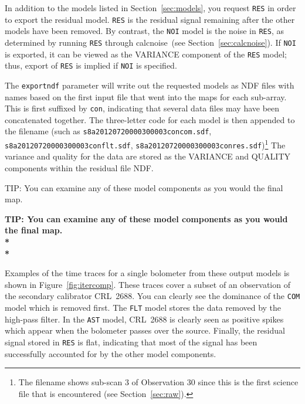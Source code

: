\documentclass[twoside,11pt]{article}
\newcommand{\htmlref}[2]{#1}
\newenvironment{latexonly}{}{}
\newcommand{\latex}[1]{#1}
\newcommand{\latexhtml}[2]{#1}
\newcommand{\xref}[3]{#1}
\renewcommand{\_}{\texttt{\symbol{95}}}
\newenvironment{fmpage}[1]{\begin{lrbox}{\fmbox}\begin{minipage}{#1}}{\end{minipage}\end{lrbox}\fbox{\usebox{\fmbox}}}
\newcommand{\task}[1]{\textsf{#1}}
\newcommand{\calcnoise}{\xref{\task{calcnoise}}{sun258}{CALCNOISE}}
\newcommand{\cref}[3]{\latexhtml{#1~\ref{#2}}{\htmlref{#3}{#2}}}
\begin{document}
In addition to the models listed in \cref{Section}{sec:models}{The
individual models}, you request \texttt{RES} in order to export the
residual model. \texttt{RES} is the residual signal remaining after
the other models have been removed. By contrast, the \texttt{NOI}
model is the noise in \texttt{RES}, as determined by running
\texttt{RES} through \calcnoise\ (see
\cref{Section}{sec:calcnoise}{Checking the array performance}). If
\texttt{NOI} is exported, it can be viewed as the VARIANCE component
of the \texttt{RES} model; thus, export of \texttt{RES} is implied if
\texttt{NOI} is specified.


The \texttt{exportndf} parameter will write out the requested models
as NDF files with names based on the first input file that went into
the maps for each sub-array. This is first suffixed by \texttt{con},
indicating that several data files may have been concatenated
together. The three-letter code for each model is then appended to the
filename (such as \texttt{s8a20120720\_00030\_0003\_con\_com.sdf},
\begin{latexonly}
\linebreak          %
\end{latexonly}
\texttt{s8a20120720\_00030\_0003\_con\_flt.sdf},
\texttt{s8a20120720\_00030\_0003\_con\_res.sdf})\footnote{The filename shows
sub-scan 3 of Observation 30 since this is the first science file that
is encountered (see \cref{Section}{sec:raw}{Raw SCUBA-2 Data}).} The variance
and quality for the data are stored as the VARIANCE and QUALITY
components within the residual file NDF.

\begin{latexonly}
\begin{center}
\begin{fmpage}{0.95\linewidth}
\vspace{0.1cm}
TIP: You can examine any of these model components as you would the final map.
\end{fmpage}
\end{center}
\end{latexonly}

\begin{htmlonly}
\textbf{TIP: You can examine any of these model components as you would the final map.\\*\\*}
\end{htmlonly}

Examples of the time traces for a single bolometer from these output
models is shown in \cref{Figure}{fig:itercomp}{time-domain
components}. These traces cover a subset of an observation of the
secondary calibrator CRL~2688. You can clearly see the dominance of the
\texttt{COM} model which is removed first. The \texttt{FLT} model
stores the data removed by the high-pass filter. In the \texttt{AST}
model, CRL~2688 is clearly seen as positive spikes which appear when
the bolometer passes over the source. Finally, the residual signal
stored in \texttt{RES} is flat, indicating that most of the signal has
been successfully accounted for by the other model components.
\end{document}
